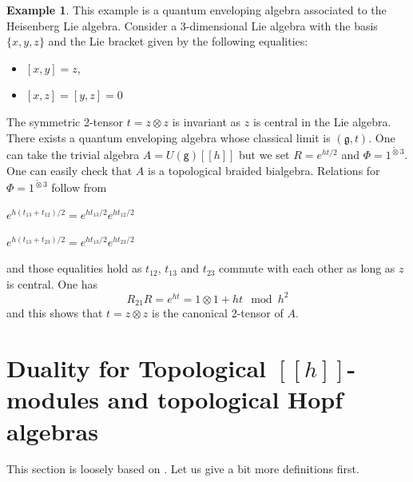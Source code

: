 \documentclass[8pt]{article}
\theoremstyle{definition}
\theoremstyle{definition}
\theoremstyle{definition}
\theoremstyle{definition}
\theoremstyle{definition}
\theoremstyle{definition}
\theoremstyle{definition}
\theoremstyle{definition}
\theoremstyle{definition}
\theoremstyle{definition}
\theoremstyle{definition}
\theoremstyle{definition}
\newtheorem{example}{Example}[section]
\theoremstyle{definition}
\theoremstyle{definition}
\theoremstyle{question}
\newcommand{\tildetimes}[0]{\widetilde{\otimes}}
\begin{document}
\begin{example} This example is a quantum enveloping algebra associated to the Heisenberg Lie algebra.
  Consider a 3-dimensional Lie algebra with the basis $\{ x, y, z \}$ and the Lie bracket given by the following equalities:
  \begin{itemize}
    \item $[x,y] = z$,
    \item $[x,z] = [y,z] = 0$
  \end{itemize}
  The symmetric 2-tensor $t = z \otimes z$ is invariant as $z$ is central in the Lie algebra. There exists
  a quantum enveloping algebra whose classical limit is $(\mathfrak{g}, t)$. One can take the trivial algebra 
  $A = U(\mathsf{g})[[h]]$ but we set $R = e^{ht/2}$ and $\Phi = 1^{\tildetimes 3}$. One can easily check that
  $A$ is a topological braided bialgebra. Relations for $\Phi = 1^{\tildetimes 3}$ follow from
  \begin{center}
    $e^{h(t_{13} + t_{12})/2} = e^{ht_{13}/2} e^{ht_{12}/2}$

    $e^{h(t_{13} + t_{23})/2} = e^{ht_{13}/2} e^{ht_{23}/2}$
  \end{center}
  and those equalities hold as $t_{12}$, $t_{13}$ and $t_{23}$ commute with each other as long as $z$ is central. One has
  \[
  R_{21} R = e^{ht} = 1 \otimes 1 + ht \mod h^2
  \]
  and this shows that $t = z \otimes z$ is the canonical 2-tensor of $A$.
\end{example}

\section{Duality for Topological $[[h]]$-modules and topological Hopf algebras}

This section is loosely based on \cite{gavarini2002quantum}. Let us give a bit more definitions first.
\end{document}
